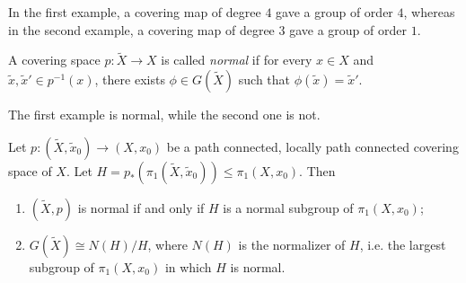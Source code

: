 \begin{remark}
  In the first example, a covering map of degree
  $4$ gave a group of order $4$, whereas in
  the second example, a covering map of degree $3$
  gave a group of order $1$.
\end{remark}

\begin{definition}
  A covering space $p : \widetilde{X} \to X$ is called
  \emph{normal} if for every $x \in X$ and
  $\widetilde{x}, \widetilde{x}' \in p^{-1}(x)$,
  there exists $\phi \in G(\widetilde{X})$ such that
  $\phi(\widetilde{x}) = \widetilde{x}'$.
\end{definition}

\begin{remark}
  The first example is normal, while the second one is
  not.
\end{remark}

\begin{theorem}
  Let $p : (\widetilde{X}, \widetilde{x}_0) \to (X, x_0)$
  be a path connected, locally path connected covering
  space of $X$. Let
  $H = p_*(\pi_1(\widetilde{X}, \widetilde{x}_0)) \le \pi_1(X, x_0)$. Then
  \begin{enumerate}
    \item $(\widetilde{X}, p)$ is normal if and only
      if $H$ is a normal subgroup of $\pi_1(X, x_0)$;
    \item $G(\widetilde{X}) \cong N(H) / H$, where
      $N(H)$ is the normalizer of $H$, i.e.
      the largest subgroup of $\pi_1(X, x_0)$
      in which $H$ is normal.
  \end{enumerate}
\end{theorem}

